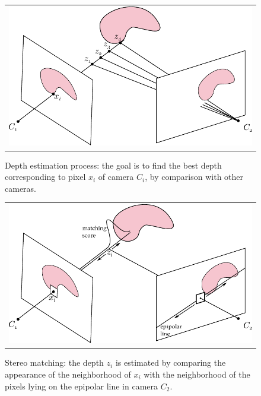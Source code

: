 \begin{figure}[t]
 \begin{tabular}{c}
  \includegraphics[width=0.98\columnwidth]{./img/ch_soa/depth}\\
 \end{tabular}
 \caption{Depth estimation process: the goal is to find the best depth corresponding to pixel $x_i$ of camera $C_i$, by comparison with other cameras.}
 \label{fig:depth}
\end{figure}


\begin{figure}[t]
 \begin{tabular}{c}
  \includegraphics[width=0.98\columnwidth]{./img/ch_soa/stereomatching}\\
 \end{tabular}
 \caption{Stereo matching: the depth $z_i$ is estimated by comparing the appearance of the neighborhood of $x_i$ with the neighborhood of the pixels lying on the epipolar line in camera $C_2$.}
 \label{fig:stereomatching}
\end{figure}


